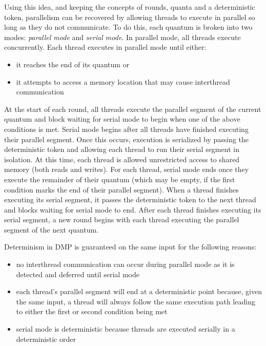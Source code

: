 Using this idea, and keeping the concepts of rounds, quanta and a
deterministic token, parallelism can be recovered by allowing threads
to execute in parallel so long as they do not communicate.  To do
this, each quantum is broken into two modes: \emph{parallel mode} and
\emph{serial mode}.  In parallel mode, all threads execute
concurrently.  Each thread executes in parallel mode until either:

\begin{itemize}
\item it reaches the end of its quantum or

\item it attempts to access a memory location that may cause
  interthread communication
\end{itemize}

At the start of each round, all threads execute the parallel segment
of the current quantum and block waiting for serial mode to begin when
one of the above conditions is met.  Serial mode begins after all
threads have finished executing their parallel segment.  Once this
occurs, execution is serialized by passing the deterministic token and
allowing each thread to run their serial segment in isolation.  At
this time, each thread is allowed unrestricted access to shared memory
(both reads and writes).  For each thread, serial mode ends once they
execute the remainder of their quantum (which may be empty, if the
first condition marks the end of their parallel segment).  When a
thread finishes executing its serial segment, it passes the
deterministic token to the next thread and blocks waiting for serial
mode to end.  After each thread finishes executing its serial segment,
a new round begins with each thread executing the parallel segment of
the next quantum.

Determinism in DMP is guaranteed on the same input for the following
reasons:

\begin{itemize}
\item no interthread communication can occur during parallel mode as
  it is detected and deferred until serial mode

\item each thread's parallel segment will end at a deterministic point
  because, given the same input, a thread will always follow the same
  execution path leading to either the first or second condition being
  met

\item serial mode is deterministic because threads are executed
  serially in a deterministic order
\end{itemize}

